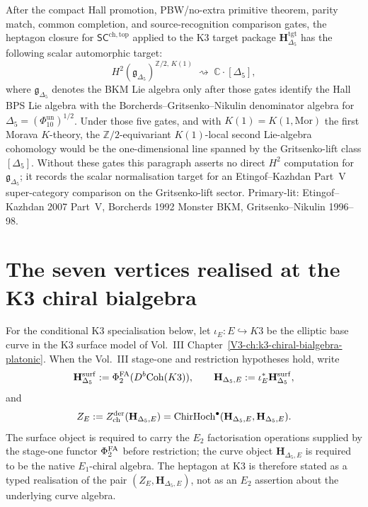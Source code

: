 \begin{remark}
\label{rem:schtop-heptagon-2}
After the compact Hall promotion, PBW/no-extra primitive theorem, parity
match, common completion, and source-recognition comparison gates, the
heptagon closure for $\mathsf{SC}^{\mathrm{ch,top}}$ applied to the K3
target package $\mathbf H_{\Delta_5}^{\mathrm{tgt}}$ has the following
scalar automorphic target:
\[
H^2(\mathfrak g_{\Delta_5})^{\mathbb Z/2,\,K(1)}
\;\rightsquigarrow\; \mathbb C\cdot[\Delta_5],
\]
where $\mathfrak g_{\Delta_5}$ denotes the BKM Lie algebra only after
those gates identify the Hall BPS Lie algebra with the
Borcherds--Gritsenko--Nikulin denominator algebra for
$\Delta_5=(\Phi_{10}^{\mathrm{un}})^{1/2}$. Under those five gates,
and with $K(1)=K(1,\mathrm{Mor})$ the first Morava $K$-theory, the
$\mathbb Z/2$-equivariant $K(1)$-local second Lie-algebra cohomology
would be the one-dimensional line spanned by the Gritsenko-lift class
$[\Delta_5]$. Without these gates this paragraph asserts no direct
$H^2$ computation for $\mathfrak g_{\Delta_5}$; it records the scalar
normalisation target for an Etingof--Kazhdan Part~V super-category
comparison on the Gritsenko-lift sector. Primary-lit:
Etingof--Kazhdan 2007 Part~V, Borcherds 1992 Monster BKM,
Gritsenko--Nikulin 1996--98.
\end{remark}

\section{The seven vertices realised at the K3 chiral bialgebra}
\label{sec:heptagon-K3-realisation}

For the conditional K3 specialisation below, let
$\iota_E\colon E\hookrightarrow K3$ be the elliptic base curve in the
K3 surface model of Vol.~III
Chapter~\ref{V3-ch:k3-chiral-bialgebra-platonic}. When the Vol.~III
stage-one and restriction hypotheses hold, write
\[
 \mathbf H_{\Delta_5}^{\mathrm{surf}}
 := \Phi^{\mathrm{FA}}_2(D^b\mathrm{Coh}(K3)),
 \qquad
 \mathbf H_{\Delta_5,E}:=\iota_E^*\mathbf H_{\Delta_5}^{\mathrm{surf}},
\]
and
\[
 Z_E :=
 Z^{\mathrm{der}}_{\mathrm{ch}}(\mathbf H_{\Delta_5,E})
 =
 \mathrm{ChirHoch}^\bullet(\mathbf H_{\Delta_5,E},\mathbf H_{\Delta_5,E}).
\]
The surface object is required to carry the $E_2$ factorisation
operations supplied by the stage-one functor $\Phi^{\mathrm{FA}}_2$ before
restriction; the curve object $\mathbf H_{\Delta_5,E}$ is required to
be the native $E_1$-chiral algebra. The heptagon at K3 is therefore
stated as a typed realisation of the pair
$(Z_E,\mathbf H_{\Delta_5,E})$, not as an $E_2$ assertion about the
underlying curve algebra.

